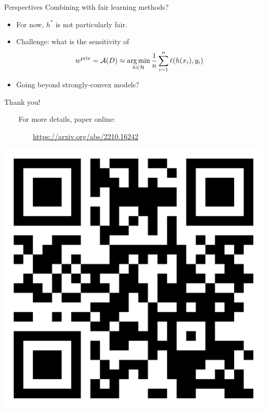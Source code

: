 \documentclass[aspectratio=169,14pt]{beamer}
\begin{document}
\begin{frame}{Perspectives}{}
  { \Large Combining with fair learning methods? }

  \begin{itemize}
  \item For now, $h^*$ is not particularly fair.

    \vspace{0.5em}

  \item Challenge: what is the sensitivity of
    \begin{align*}
      w^{\text{priv}} = \mathcal{A}(D) \approx \operatorname*{arg\,min}_{h\in\mathcal{H}}  \frac{1}{n} \sum_{i=1}^n \ell(h(x_i),y_i)
    \end{align*}

    \vspace{0.5em}

  \item Going beyond strongly-convex models?
  \end{itemize}
\end{frame}

\begin{frame}{}
  \begin{minipage}[t][\arraycolsep][t]{0.75\linewidth}
    {\LARGE Thank you!}

    \vspace{1em}

    ~~~~For more details, paper online:

    ~~~~~~~~\url{https://arxiv.org/abs/2210.16242}
  \end{minipage}%
  \begin{minipage}{0.25\linewidth}
    \vspace{4em}
    \includegraphics[width=\linewidth]{img/arxivfairnessprivacy.png}
  \end{minipage}
\end{frame}
\end{document}
